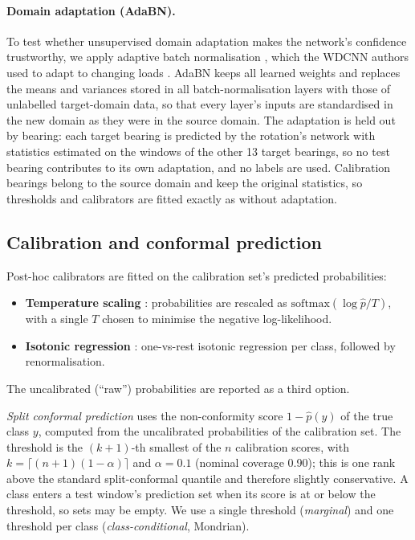 \paragraph{Domain adaptation (AdaBN).} To test whether unsupervised domain adaptation makes the network's confidence
trustworthy, we apply adaptive batch normalisation \citep[AdaBN;][]{li2018}, which the WDCNN authors used to adapt
to changing loads \citep{zhang2017}. AdaBN keeps all learned weights and replaces the means and variances stored in
all batch-normalisation layers with those of unlabelled target-domain data, so that every layer's inputs are
standardised in the new domain as they were in the source domain. The adaptation is held out by bearing: each target
bearing is predicted by the rotation's network with statistics estimated on the windows of the other 13 target
bearings, so no test bearing contributes to its own adaptation, and no labels are used. Calibration bearings belong to
the source domain and keep the original statistics, so thresholds and calibrators are fitted exactly as without
adaptation.

\subsection{Calibration and conformal prediction}

Post-hoc calibrators are fitted on the calibration set's predicted probabilities:
\begin{itemize}[nosep]
  \item \textbf{Temperature scaling} \citep{guo2017}: probabilities are rescaled as
        $\mathrm{softmax}(\log \hat{p} / T)$, with a single $T$ chosen to minimise the negative log-likelihood.
  \item \textbf{Isotonic regression} \citep{zadrozny2002}: one-vs-rest isotonic regression per class, followed by
        renormalisation.
\end{itemize}
The uncalibrated (``raw'') probabilities are reported as a third option.

\emph{Split conformal prediction} \citep{vovk2005,angelopoulos2023} uses the non-conformity score
$1 - \hat{p}(y)$ of the true class $y$, computed from the uncalibrated probabilities of the calibration set. The
threshold is the $(k+1)$-th smallest of the $n$ calibration scores, with $k = \lceil (n+1)(1-\alpha) \rceil$ and
$\alpha = 0.1$ (nominal coverage 0.90); this is one rank above the standard split-conformal quantile and therefore
slightly conservative. A class enters a test window's prediction set when its score is at or below the threshold, so sets may
be empty. We use a single threshold (\emph{marginal}) and one threshold per class (\emph{class-conditional},
Mondrian).

